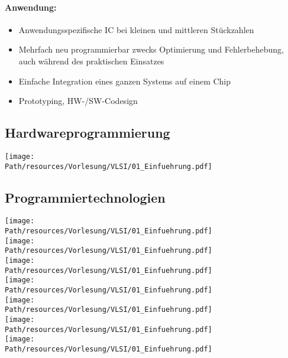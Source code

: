 	\paragraph{Anwendung:}
	\begin{itemize}
		\item Anwendungsspezifische IC bei kleinen und mittleren Stückzahlen
		\item Mehrfach neu programmierbar zwecks Optimierung und Fehlerbehebung, auch während des praktischen Einsatzes
		\item Einfache Integration eines ganzen Systems auf einem Chip
		\item Prototyping, HW-/SW-Codesign
	\end{itemize}

\subsection{Hardwareprogrammierung}
	\begin{center}
	\texttt{[image: \\Path/resources/Vorlesung/VLSI/01\_Einfuehrung.pdf]}
	\end{center}
\subsection{Programmiertechnologien}
	\begin{center}
	\texttt{[image: \\Path/resources/Vorlesung/VLSI/01\_Einfuehrung.pdf]}
	\\\texttt{[image: \\Path/resources/Vorlesung/VLSI/01\_Einfuehrung.pdf]}
	\\\texttt{[image: \\Path/resources/Vorlesung/VLSI/01\_Einfuehrung.pdf]}
	\\\texttt{[image: \\Path/resources/Vorlesung/VLSI/01\_Einfuehrung.pdf]}
	\\\texttt{[image: \\Path/resources/Vorlesung/VLSI/01\_Einfuehrung.pdf]}
	\\\texttt{[image: \\Path/resources/Vorlesung/VLSI/01\_Einfuehrung.pdf]}
	\\\texttt{[image: \\Path/resources/Vorlesung/VLSI/01\_Einfuehrung.pdf]}
	\end{center}

